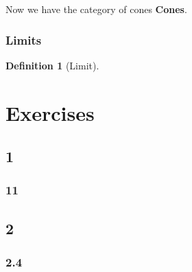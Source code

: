 \documentclass{book}
\theoremstyle{definition}
\newtheorem{definition}{Definition}[section]
\begin{document}
Now we have the category of cones \textbf{Cones}.

\subsection{Limits}

\begin{definition}[Limit]
\end{definition}



\chapter{Exercises}

\section{1}

\subsection{11}

\section{2}

\subsection{2.4}
\end{document}
